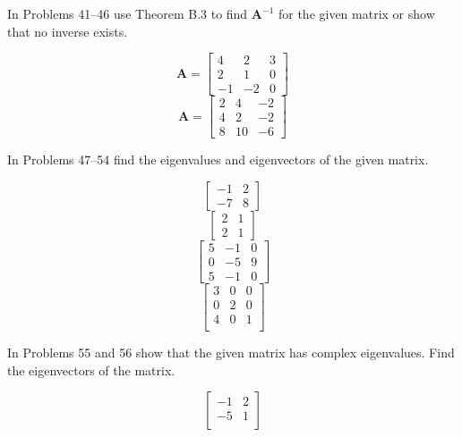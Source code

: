 \documentclass[chapter=2,section=1]{math252homework}
\begin{document}
In Problems 41--46 use Theorem B.3 to find $\mathbf{A}^{-1}$ for the given matrix or show that no inverse exists.
\begin{problems}[start=41]
	\problem \[ \mathbf{A} = \left[ \begin{array}{ccc}
		4 & 2 & 3\\
		2 & 1 & 0\\
		-1 & -2 & 0
	\end{array} \right] \]						%
	\problem \[ \mathbf{A} = \left[ \begin{array}{ccc}
		2 & 4 & -2\\
		4 & 2 & -2\\
		8 & 10 & -6
	\end{array} \right] \]						%
\end{problems}

In Problems 47--54 find the eigenvalues and eigenvectors of the given matrix.
\begin{problems}[start=47]
	\problem \[ \left[ \begin{array}{cc}
		-1 & 2\\
		-7 & 8
	\end{array} \right] \]						%
	\problem \[ \left[ \begin{array}{cc}
		2 & 1\\
		2 & 1
	\end{array} \right] \]						%
	\setcounter{problemsi}{50}
	\problem \[ \left[ \begin{array}{ccc}
		5 & -1 & 0\\
		0 & -5 & 9\\
		5 & -1 & 0
	\end{array} \right] \]						%
	\problem \[ \left[ \begin{array}{ccc}
		3 & 0 & 0\\
		0 & 2 & 0\\
		4 & 0 & 1\\
	\end{array} \right] \]						%
\end{problems}

In Problems 55 and 56 show that the given matrix has complex eigenvalues.
Find the eigenvectors of the matrix.
\begin{problems}[start=55]
	\problem \[ \left[ \begin{array}{cc}
		-1 & 2\\
		-5 & 1\\
	\end{array} \right] \]						%
\end{problems}
\end{document}

